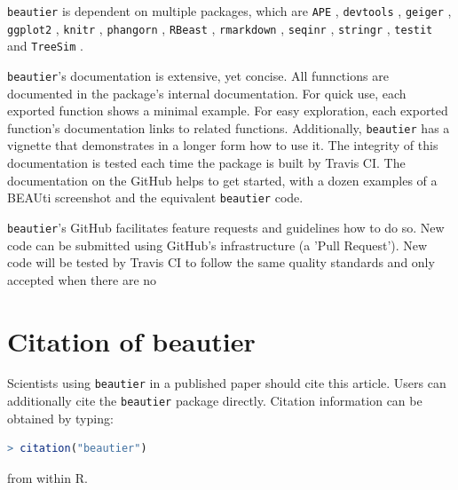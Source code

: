 \documentclass{article}
\begin{document}
\verb;beautier; is dependent on multiple packages, which are 
\verb;APE; \cite{APE}, 
\verb;devtools; \cite{devtools},
\verb;geiger; \cite{GEIGER},
\verb;ggplot2; \cite{ggplot2},
\verb;knitr; \cite{knitr},
\verb;phangorn; \cite{phangorn},
\verb;RBeast; \cite{RBeast},
\verb;rmarkdown; \cite{rmarkdown},
\verb;seqinr; \cite{seqinr},
\verb;stringr; \cite{stringr},
\verb;testit; \cite{testit} and 
\verb;TreeSim; \cite{TreeSim}.

\verb;beautier;'s documentation is extensive, yet concise. All funnctions are documented
in the package's internal documentation. For quick use, each exported function shows a minimal example. 
For easy exploration, each exported function's documentation links to related functions.
Additionally, \verb;beautier; has a vignette that demonstrates in a longer form how
to use it. The integrity of this documentation is tested each time the package is built by Travis CI.
The documentation on the GitHub helps to get started, with a dozen examples 
of a BEAUti screenshot and the equivalent \verb;beautier; code.

\verb;beautier;'s GitHub facilitates feature requests and guidelines how to do so.
New code can be submitted using GitHub's infrastructure (a 'Pull Request'). New
code will be tested by Travis CI to follow the same quality standards and only accepted
when there are no 


\section{Citation of beautier}

Scientists using \verb;beautier; in a published paper should cite this
article. Users can additionally cite the \verb;beautier; package 
directly. Citation information can be obtained by typing:

\begin{lstlisting}[language=R]
> citation("beautier")
\end{lstlisting}

from within R.




\begin{thebibliography}{}

\end{thebibliography}
\end{document}
